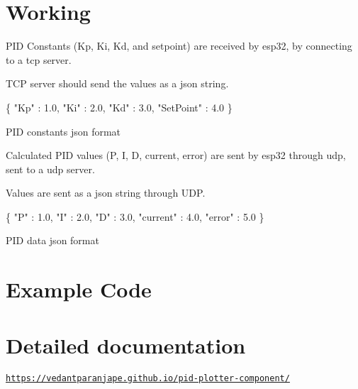 \section*{Working}


\begin{DoxyItemize}
\item P\+ID Constants (Kp, Ki, Kd, and setpoint) are received by esp32, by connecting to a tcp server.
\item T\+CP server should send the values as a json string. 
\begin{DoxyCode}
\{
    "Kp" : 1.0,
    "Ki" : 2.0,
    "Kd" : 3.0,
    "SetPoint" : 4.0
\}

PID constants json format
\end{DoxyCode}

\item Calculated P\+ID values (P, I, D, current, error) are sent by esp32 through udp, sent to a udp server.
\item Values are sent as a json string through U\+DP. 
\begin{DoxyCode}
\{
    "P" : 1.0,
    "I" : 2.0,
    "D" : 3.0,
    "current" : 4.0,
    "error" : 5.0
\}

PID data json format
\end{DoxyCode}
 \section*{Example Code}
\end{DoxyItemize}


 \section*{Detailed documentation}


\begin{DoxyItemize}
\item \href{https://vedantparanjape.github.io/pid-plotter-component/}{\tt https\+://vedantparanjape.\+github.\+io/pid-\/plotter-\/component/} 
\end{DoxyItemize}
